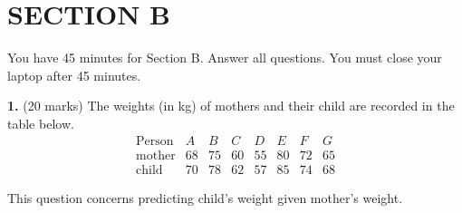 \documentclass{article}
\begin{document}
\newpage
\section*{SECTION B}
You have 45 minutes for Section B. Answer all questions. You must close your laptop after 45 minutes.

\bigskip

\textbf{1.} (20 marks) The weights (in kg) of mothers and their child are recorded in the table below.
\[
\begin{array}{c|ccccccc}
\text{Person} & A & B & C & D & E & F & G\\
\hline
\text{mother} & 68 & 75 & 60 & 55 & 80 & 72 & 65\\
\text{child} & 70 & 78 & 62 & 57 & 85 & 74 & 68
\end{array}
\]

This question concerns predicting child's weight given mother's weight.
\end{document}
